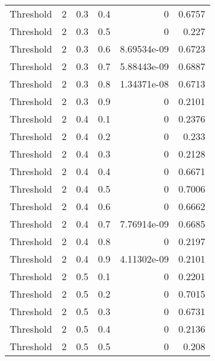 \documentclass{article}
\begin{document}
\begin{longtable}[H]{lrrrrr}
 Threshold      &       2 &   0.3 &            0.4 &      0           &          0.6757 \\
 Threshold      &       2 &   0.3 &            0.5 &      0           &          0.227  \\
 Threshold      &       2 &   0.3 &            0.6 &      8.69534e-09 &          0.6723 \\
 Threshold      &       2 &   0.3 &            0.7 &      5.88443e-09 &          0.6887 \\
 Threshold      &       2 &   0.3 &            0.8 &      1.34371e-08 &          0.6713 \\
 Threshold      &       2 &   0.3 &            0.9 &      0           &          0.2101 \\
 Threshold      &       2 &   0.4 &            0.1 &      0           &          0.2376 \\
 Threshold      &       2 &   0.4 &            0.2 &      0           &          0.233  \\
 Threshold      &       2 &   0.4 &            0.3 &      0           &          0.2128 \\
 Threshold      &       2 &   0.4 &            0.4 &      0           &          0.6671 \\
 Threshold      &       2 &   0.4 &            0.5 &      0           &          0.7006 \\
 Threshold      &       2 &   0.4 &            0.6 &      0           &          0.6662 \\
 Threshold      &       2 &   0.4 &            0.7 &      7.76914e-09 &          0.6685 \\
 Threshold      &       2 &   0.4 &            0.8 &      0           &          0.2197 \\
 Threshold      &       2 &   0.4 &            0.9 &      4.11302e-09 &          0.2101 \\
 Threshold      &       2 &   0.5 &            0.1 &      0           &          0.2201 \\
 Threshold      &       2 &   0.5 &            0.2 &      0           &          0.7015 \\
 Threshold      &       2 &   0.5 &            0.3 &      0           &          0.6731 \\
 Threshold      &       2 &   0.5 &            0.4 &      0           &          0.2136 \\
 Threshold      &       2 &   0.5 &            0.5 &      0           &          0.208  \\

\end{longtable}
\end{document}
